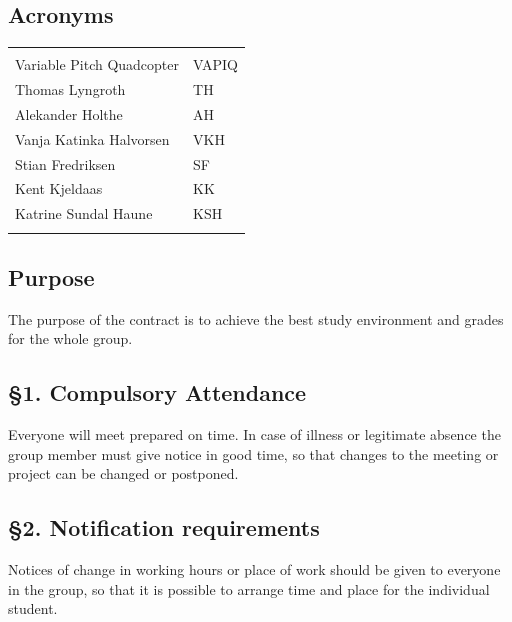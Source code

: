 \documentclass{article}
\begin{document}
\vspace*{3.0 cm}

\begin{center}
\section*{\textbf{Acronyms}}
\begin{tabular}{ll}
\rowcolor{cadetgrey}
    &   \\
Variable Pitch Quadcopter   & VAPIQ \\\rowcolor{gainsboro}
Thomas Lyngroth       & TH          \\ 
Alekander Holthe      & AH          \\\rowcolor{gainsboro}
Vanja Katinka Halvorsen     & VKH   \\
Stian Fredriksen      & SF          \\\rowcolor{gainsboro}
Kent Kjeldaas         & KK          \\
Katrine Sundal Haune  & KSH         \\\rowcolor{gainsboro}
\end{tabular}                                                             
\end{center}
\newpage



\vspace*{1.0 cm}
\subsection*{Purpose}
The purpose of the contract is to achieve the best study environment and grades for the whole group.

\subsection*{§1. Compulsory Attendance}
Everyone will meet prepared on time. In case of illness or legitimate absence the group member must give notice in good time, so that changes to the meeting or project can be changed or postponed.

\subsection*{§2. Notification requirements}
Notices of change in working hours or place of work should be given to everyone in the group, so that it is possible to arrange time and place for the individual student.
\end{document}
